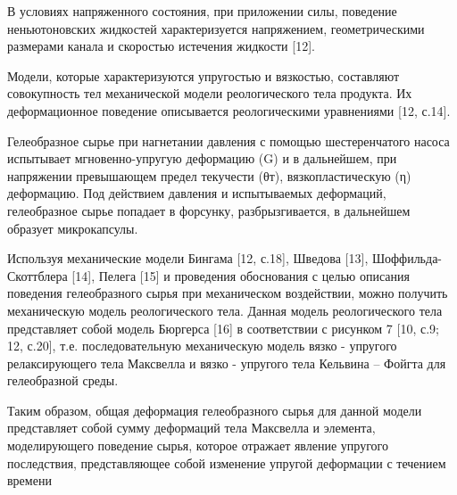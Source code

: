 В условиях напряженного состояния, при приложении силы, поведение
неньютоновских жидкостей характеризуется напряжением, геометрическими
размерами канала и скоростью истечения жидкости {[}12{]}.

Модели, которые характеризуются упругостью и вязкостью, составляют
совокупность тел механической модели реологического тела продукта. Их
деформационное поведение описывается реологическими уравнениями {[}12,
с.14{]}.

Гелеобразное сырье при нагнетании давления с помощью шестеренчатого
насоса испытывает мгновенно-упругую деформацию (G) и в дальнейшем, при
напряжении превышающем предел текучести (θт), вязкопластическую (η)
деформацию. Под действием давления и испытываемых деформаций,
гелеобразное сырье попадает в форсунку, разбрызгивается, в дальнейшем
образует микрокапсулы.

Используя механические модели Бингама {[}12, с.18{]}, Шведова {[}13{]},
Шоффильда-Скоттблера {[}14{]}, Пелега {[}15{]} и проведения обоснования
с целью описания поведения гелеобразного сырья при механическом
воздействии, можно получить механическую модель реологического тела.
Данная модель реологического тела представляет собой модель Бюргерса
{[}16{]} в соответствии с рисунком 7 {[}10, с.9; 12, с.20{]}, т.е.
последовательную механическую модель вязко - упругого релаксирующего
тела Максвелла и вязко - упругого тела Кельвина -- Фойгта для
гелеобразной среды.

Таким образом, общая деформация гелеобразного сырья для данной модели
представляет собой сумму деформаций тела Максвелла и элемента,
моделирующего поведение сырья, которое отражает явление упругого
последствия, представляющее собой изменение упругой деформации с
течением времени


